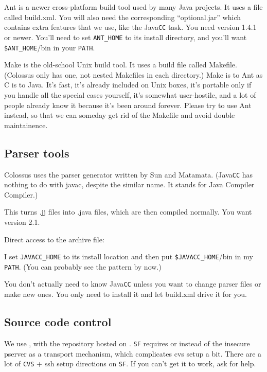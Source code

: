 \documentclass{article}
\begin{document}
Ant is a newer cross-platform build tool used by many Java projects.  
It uses a file called build.xml. You will also need the corresponding
``optional.jar'' which contains extra features that we use, like the 
Java\texttt{CC} task.  You need version 1.4.1 or newer.  You'll need to set 
\texttt{ANT\_HOME} to its install directory, and you'll want \texttt{\$ANT\_HOME}/bin in 
your \texttt{PATH}.

Make is the old-school Unix build tool.  It uses a build file called
Makefile.  (Colossus only has one, not nested Makefiles in each
directory.)  Make is to Ant as C is to Java.  It's fast, it's already
included on Unix boxes, it's portable only if you handle all the special
cases yourself, it's somewhat user-hostile, and a lot of people already 
know it because it's been around forever.  Please try to use Ant instead, 
so that we can someday get rid of the Makefile and avoid double 
maintainence.

\subsection{Parser tools}

Colossus uses the  parser generator written by Sun and Matamata.  
(Java\texttt{CC} has nothing to do with javac, despite the similar name.  It
stands for Java Compiler Compiler.)

This turns .jj files into .java files, which are then compiled normally.  
You want version 2.1.

Direct access to the archive file: 

I set \texttt{JAVACC\_HOME} to its install location and then put \texttt{\$JAVACC\_HOME}/bin
in my \texttt{PATH}.  (You can probably see the pattern by now.)

You don't actually need to know Java\texttt{CC} unless you want to change parser
files or make new ones.  You only need to install it and let build.xml
drive it for you.

\subsection{Source code control}

We use , with the repository hosted on .
\texttt{SF} requires  or
  instead of the insecure pserver as a transport mechanism,
which complicates cvs setup a bit.  There are a lot of \texttt{CVS} +
ssh setup directions on \texttt{SF}.  If you can't get it to work,
ask for help.
\end{document}

